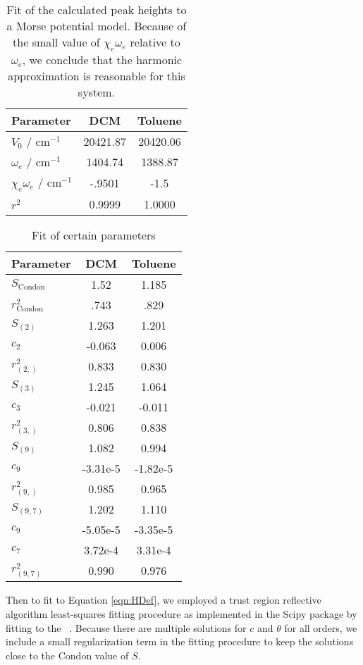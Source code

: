 \begin{table}
 \begin{tabular}{lcc}
 \hline
 Parameter & DCM & Toluene \\
 \hline
 $V_0$ / cm$^{-1}$  & 20421.87 &  20420.06\\
 $\omega_e$ / cm$^{-1}$ & 1404.74 & 1388.87 \\
 $\chi_e \omega_e$ / cm$^{-1}$ & -.9501 &  -1.5 \\
 $r^2$ & 0.9999 &  1.0000 \\
 \hline
\end{tabular}
\caption{ Fit of the calculated peak heights to a Morse potential model.  Because of the small value of $\chi_e \omega_e$ relative to $\omega_e$, we conclude that the harmonic approximation is reasonable for this system.}
\label{table:energyFit}
\end{table}


\begin{table}
 \begin{tabular}{lcc}
 \hline
 \textbf{Parameter} & \textbf{DCM} & \textbf{Toluene} \\
 \hline
 $S_{\text{Condon}}$ & 1.52 & 1.185 \\
 $r^2_{\text{Condon}}$ & .743 & .829\\
 \hline
 $S_{ (2) }$ & 1.263  &  1.201 \\
 $c_{ 2 }$ & -0.063  &  0.006 \\
 $r^2_{ (2,) }$ & 0.833  &  0.830 \\
 \hline
 $S_{ (3) }$ & 1.245  &  1.064 \\
 $c_{ 3 }$ & -0.021  &  -0.011 \\
 $r^2_{ (3,) }$ & 0.806  &  0.838 \\
 \hline
 $S_{ (9) }$ & 1.082  &  0.994 \\
$c_{ 9 }$ & -3.31e-5  &  -1.82e-5 \\
$r^2_{ (9,) }$ & 0.985  &  0.965 \\
\hline
 $S_{ (9, 7) }$ & 1.202  &  1.110 \\
$c_{ 9 }$ & -5.05e-5  &  -3.35e-5 \\
$c_{ 7 }$ & 3.72e-4  &  3.31e-4 \\
$r^2_{ (9, 7) }$ & 0.990  &  0.976 \\
\hline
\end{tabular}
\caption{Fit of certain parameters}
\label{table:peakFit}
\end{table}

Then to fit to Equation \ref{eqn:HDef}, we employed a trust region reflective algorithm least-squares fitting procedure as implemented in the Scipy package by fitting to the ~\cite{scipy,numpy}.  Because there are multiple solutions for $c$ and $\theta$ for all orders, we include a small regularization term in the fitting procedure to keep the solutions close to the Condon value of $S$.

